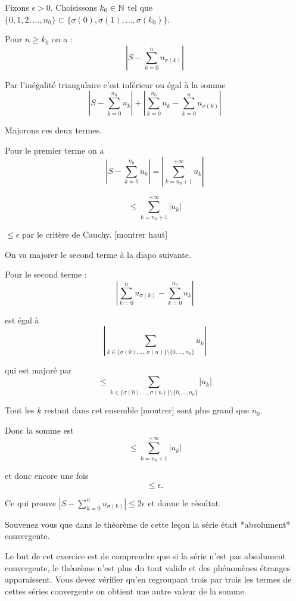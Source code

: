 \change
Fixons $\epsilon>0$.  Choisissons $k_0\in\mathbb{N}$ tel que 
$\big\{0, 1,2,\dots,n_0\big\} \subset \big\{\sigma(0),\sigma(1),\ldots, \sigma(k_0)\big\}$.  

\change
Pour $n\geq k_0$ on a :
$$\left|S-\sum_{k=0}^n u_{\sigma(k)}\right| $$

\change

Par l'inégalité triangulaire c'est inférieur ou égal à la somme
$$
\left|S-\sum_{k=0}^{n_0} u_k\right|+\left|\sum_{k=0}^{n_0} u_k- 
\sum_{k=0}^n u_{\sigma(k)}\right|$$

\change
Majorons ces deux termes.

Pour le premier terme on a 
$$\left|S-\sum_{k=0}^{n_0} u_k\right| = \left| \sum_{k=n_0+1}^{+\infty} u_k\right| $$

\change
$$
\le \sum_{k=n_0+1}^{+\infty} |u_k|$$

\change
$\le \epsilon$
par le critère de Cauchy. [montrer haut]

On va majorer le second terme à la diapo suivante.

\diapo

Pour le second terme :
$$\left|\sum_{k=0}^n u_{\sigma(k)}-\sum_{k=0}^{n_0} u_k\right|$$


\change
est égal à
$$\left|\sum_{k \in \{\sigma(0),\ldots,\sigma(n)\}\setminus\{0,\ldots,n_0\}} u_k \right|$$

\change
qui est majoré par
$$
\le \sum_{k \in \{\sigma(0),\ldots,\sigma(n)\}\setminus\{0,\ldots,n_0\}} |u_k| $$

Tout les $k$ restant dans cet ensemble [montrer] sont plus grand que $n_0$.

\change

Donc la somme est 
$$
\le \sum_{k=n_0+1}^{+\infty} |u_k|$$

\change
et donc encore une fois 
$$
\le \epsilon.$$

\change
Ce qui prouve $\left|S-\sum_{k=0}^n u_{\sigma(k)}\right| \le 2\epsilon$ et donne le résultat.

\diapo

Souvenez vous que dans le théorème de cette leçon la série était *absolument* convergente.

Le but de cet exercice est de comprendre que si la série n'est pas absolument convergente,
le théorème n'est plus du tout valide et des phénomènes étranges apparaissent. 
Vous devez vérifier qu'en regroupant trois par trois les termes de cettes séries convergente on obtient
une autre valeur de la somme.



